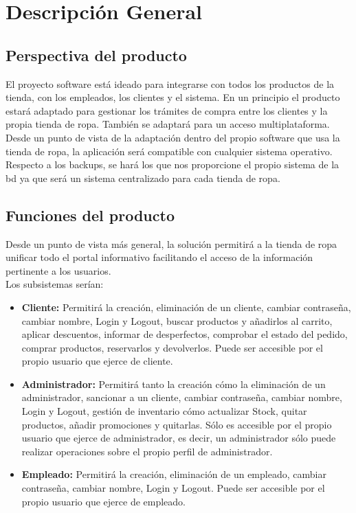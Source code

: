 \section{Descripción General }
\label{sec:desc_gen}
\subsection{Perspectiva del producto}
El proyecto software está ideado para integrarse con todos los productos de la tienda, con los empleados, los clientes y el sistema.
En un principio el producto estará adaptado para gestionar los trámites de compra entre los clientes y la propia tienda de ropa. También se adaptará para un acceso multiplataforma.
Desde un punto de vista de la adaptación dentro del propio software que usa la tienda de ropa, la aplicación será compatible con cualquier sistema operativo.
Respecto a los backups, se hará los que nos proporcione el propio sistema de la \gls{bd} ya que será un sistema centralizado para cada tienda de ropa.
\subsection{Funciones del producto}
Desde un punto de vista más general, la solución permitirá a la tienda de ropa unificar todo el portal
informativo facilitando el acceso de la información pertinente a los usuarios.\\
Los subsistemas serían:

\begin{itemize}
    \item\textbf{Cliente: }Permitirá la creación, eliminación de un cliente, cambiar contraseña, cambiar nombre, Login y Logout, buscar productos y añadirlos al carrito, aplicar descuentos, informar de desperfectos, comprobar el estado del pedido, comprar productos, reservarlos y devolverlos. Puede ser accesible por el propio usuario que ejerce de cliente.
    \item\textbf{Administrador: }Permitirá tanto la creación cómo la eliminación de un administrador, sancionar a un cliente, cambiar contraseña, cambiar nombre, Login y Logout, gestión de inventario cómo actualizar Stock, quitar productos, añadir promociones y quitarlas. Sólo es accesible por el propio usuario que ejerce de administrador, es decir, un administrador sólo puede realizar operaciones sobre el propio perfil de administrador.
    \item\textbf{Empleado: }Permitirá la creación, eliminación de un empleado, cambiar contraseña, cambiar nombre, Login y Logout. Puede ser accesible por el propio usuario que ejerce de empleado.
\end{itemize}

